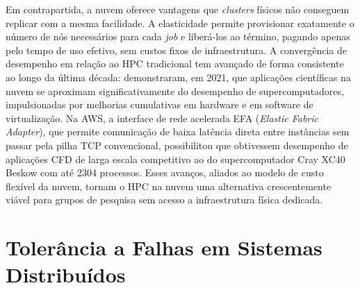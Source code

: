 Em contrapartida, a nuvem oferece vantagens que \textit{clusters} físicos não
conseguem replicar com a mesma facilidade. A elasticidade permite provisionar
exatamente o número de nós necessários para cada \textit{job} e liberá-los ao
término, pagando apenas pelo tempo de uso efetivo, sem custos fixos de infraestrutura.
A convergência de desempenho em relação ao HPC tradicional tem avançado de forma
consistente ao longo da última década:  demonstraram, em
2021, que aplicações científicas na nuvem se aproximam significativamente do
desempenho de supercomputadores, impulsionadas por melhorias cumulativas em hardware
e em software de virtualização. Na AWS, a interface de rede acelerada EFA
(\textit{Elastic Fabric Adapter}), que permite comunicação de baixa latência direta
entre instâncias sem passar pela pilha TCP convencional, possibilitou que
 obtivessem desempenho de aplicações CFD de larga
escala competitivo ao do supercomputador Cray XC40 Beskow com até 2304 processos.
Esses avanços, aliados ao modelo de custo flexível da nuvem, tornam o HPC na nuvem
uma alternativa crescentemente viável para grupos de
pesquisa sem acesso a infraestrutura física dedicada.


\section{Tolerância a Falhas em Sistemas Distribuídos}
\label{sec:fault-tolerance}

